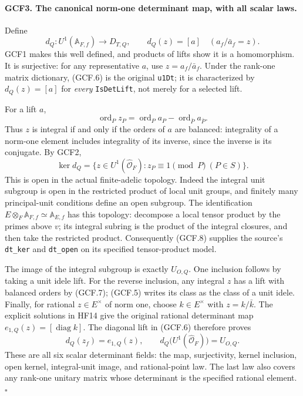 \paragraph{GCF3. The canonical norm-one determinant map, with all scalar laws.}
\label{claim:GCF3}
Define
\[
 d_Q:U^1(\mathbb A_{F,f})\longrightarrow D_{T,Q},\qquad
                d_Q(z)=[a]\quad(a_f/\bar a_f=z).        \tag{GCF.6}
\]
GCF1 makes this well defined, and products of lifts show it is a
homomorphism.  It is surjective: for any representative \(a\), use
\(z=a_f/\bar a_f\).  Under the rank-one matrix dictionary, (GCF.6)
is the original \texttt{u1Dt}; it is characterized by
\(d_Q(z)=[a]\) for \emph{every} \texttt{IsDetLift}, not merely for a
selected lift.

For a lift \(a\),
\[
 \operatorname{ord}_P z_P=
       \operatorname{ord}_P a_P-
                  \operatorname{ord}_{\bar P}a_{\bar P}.
 \tag{GCF.7}
\]
Thus \(z\) is integral if and only if the orders of \(a\) are
balanced: integrality of a norm-one element includes integrality of
its inverse, since the inverse is its conjugate.  By GCF2,
\[
 \ker d_Q=
 \{z\in U^1(\widehat{\mathcal O}_F):z_P\equiv1\pmod P
                                                    \ (P\in S)\}.
 \tag{GCF.8}
\]
This is open in the actual finite-adelic topology.  Indeed the integral
unit subgroup is open in the restricted product of local unit groups,
and finitely many principal-unit conditions define an open subgroup.
The identification \(E\otimes_F\mathbb A_{F,f}\simeq
\mathbb A_{E,f}\) has this topology: decompose a local tensor product
by the primes above \(v\); its integral subring is the product of the
integral closures, and then take the restricted product.  Consequently
(GCF.8) supplies the source's \texttt{dt\_ker} and \texttt{dt\_open}
on its specified tensor-product model.

The image of the integral subgroup is exactly \(U_{O,Q}\).
One inclusion follows by taking a unit idele lift.  For the reverse
inclusion, any integral \(z\) has a lift with balanced orders by
(GCF.7); (GCF.5) writes its class as the class of a unit idele.
Finally, for rational \(z\in E^{\times}\) of norm one, choose
\(k\in E^{\times}\) with \(z=k/\bar k\).  The explicit solutions
in HF14 give the original rational determinant map
\(e_{1,Q}(z)=[\operatorname{diag}k]\).  The diagonal lift in
(GCF.6) therefore proves
\[
 d_Q(z_f)=e_{1,Q}(z),\qquad
 d_Q\bigl(U^1(\widehat{\mathcal O}_F)\bigr)=U_{O,Q}.    \tag{GCF.9}
\]
These are all six scalar determinant fields: the map, surjectivity,
kernel inclusion, open kernel, integral-unit image, and rational-point
law.  The last law also covers any rank-one unitary matrix whose
determinant is the specified rational element.
\hfill\(\square\)

